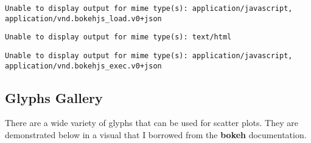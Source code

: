 \documentclass[
  letterpaper,
  DIV=11,
  numbers=noendperiod]{scrreprt}
\begin{document}
\begin{verbatim}
Unable to display output for mime type(s): application/javascript, application/vnd.bokehjs_load.v0+json
\end{verbatim}

\begin{verbatim}
Unable to display output for mime type(s): text/html
\end{verbatim}

\begin{verbatim}
Unable to display output for mime type(s): application/javascript, application/vnd.bokehjs_exec.v0+json
\end{verbatim}

\hypertarget{glyphs-gallery}{%
\subsection{Glyphs Gallery}\label{glyphs-gallery}}

There are a wide variety of glyphs that can be used for scatter plots.
They are demonstrated below in a visual that I borrowed from the
\textbf{bokeh} documentation.
\end{document}
